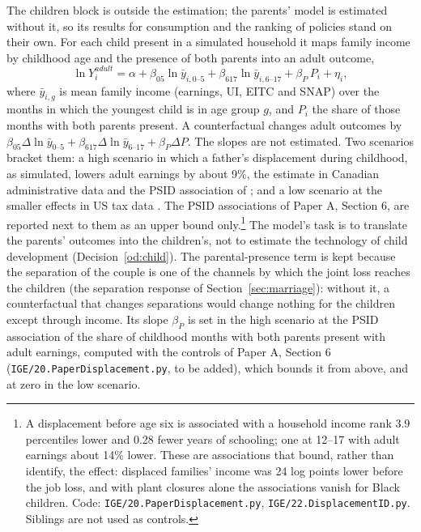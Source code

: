 \documentclass[11pt]{article}
\newcommand{\code}[1]{\texttt{#1}}
\newcommand{\1}{\mathbf{1}}
\begin{document}
The children block is outside the estimation; the parents' model is estimated without it, so its results for
consumption and the ranking of policies stand on their own. For each child present in a simulated household it maps
family income by childhood age and the presence of both parents into an adult outcome,
\begin{equation}\label{eq:child}
  \ln Y^{adult}_i = \alpha + \beta_{05} \ln \bar y_{i,0\text{--}5} + \beta_{617} \ln \bar y_{i,6\text{--}17}
    + \beta_P\, P_i + \eta_i,
\end{equation}
where $\bar y_{i,g}$ is mean family income (earnings, UI, EITC and SNAP) over the months in which the youngest child is
in age group $g$, and $P_i$ the share of those months with both parents present. A counterfactual changes adult
outcomes by $\beta_{05}\Delta\ln\bar y_{0\text{--}5} + \beta_{617}\Delta\ln\bar y_{6\text{--}17} + \beta_P\Delta P$. The slopes
are not estimated. Two scenarios bracket them: a high scenario in which a father's displacement during childhood, as
simulated, lowers adult earnings by about 9\%, the estimate in Canadian administrative data
\citep{oreopoulos2008intergenerational} and the PSID association of \citet{page2009parental}; and a low scenario at the
smaller effects in US tax data \citep{hilger2016parental}. The PSID associations of Paper A, Section 6, are reported next
to them as an upper bound only.\footnote{A displacement before age six is associated with a household income rank 3.9
percentiles lower and 0.28 fewer years of schooling; one at 12--17 with adult earnings about 14\% lower. These are
associations that bound, rather than identify, the effect: displaced families' income was 24 log points lower before
the job loss, and with plant closures alone the associations vanish for Black children. Code:
\code{IGE/20.PaperDisplacement.py}, \code{IGE/22.DisplacementID.py}. Siblings are not used as controls.}
The model's task is to translate the parents' outcomes into the children's, not to estimate the technology of child
development (Decision~\ref{od:child}). The parental-presence term is kept because the separation of the couple is one
of the channels by which the joint loss reaches the children (the separation response of Section~\ref{sec:marriage}):
without it, a counterfactual that changes separations would change nothing for the children except through income. Its
slope $\beta_P$ is set in the high scenario at the PSID association of the share of childhood months with both parents
present with adult earnings, computed with the controls of Paper A, Section 6 (\code{IGE/20.PaperDisplacement.py}, to be
added), which bounds it from above, and at zero in the low scenario.
\end{document}
